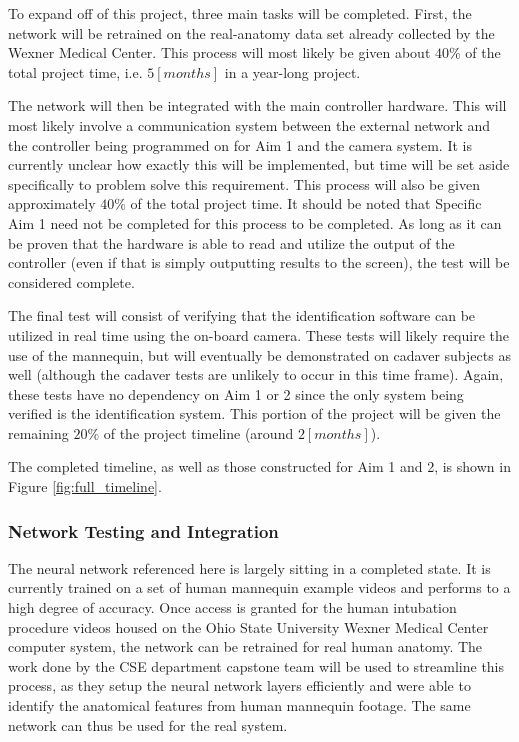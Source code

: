 		To expand off of this project, three main tasks will be completed. First, the network will be retrained on the real-anatomy data set already collected by the Wexner Medical Center. This process will most likely be given about $40\%$ of the total project time, i.e. $5[months]$ in a year-long project.
		
		The network will then be integrated with the main controller hardware. This will most likely involve a communication system between the external network and the controller being programmed on for Aim 1 and the camera system. It is currently unclear how exactly this will be implemented, but time will be set aside specifically to problem solve this requirement. This process will also be given approximately $40\%$ of the total project time. It should be noted that Specific Aim 1 need not be completed for this process to be completed. As long as it can be proven that the hardware is able to read and utilize the output of the controller (even if that is simply outputting results to the screen), the test will be considered complete.
		
		The final test will consist of verifying that the identification software can be utilized in real time using the on-board camera. These tests will likely require the use of the mannequin, but will eventually be demonstrated on cadaver subjects as well (although the cadaver tests are unlikely to occur in this time frame). Again, these tests have no dependency on Aim 1 or 2 since the only system being verified is the identification system. This portion of the project will be given the remaining $20\%$ of the project timeline (around $2[months]$).

		The completed timeline, as well as those constructed for Aim 1 and 2, is shown in Figure \ref{fig:full_timeline}.
		
	\subsubsection{Network Testing and Integration}
		The neural network referenced here is largely sitting in a completed state. It is currently trained on a set of human mannequin example videos and performs to a high degree of accuracy. Once access is granted for the human intubation procedure videos housed on the Ohio State University Wexner Medical Center computer system, the network can be retrained for real human anatomy. The work done by the CSE department capstone team will be used to streamline this process, as they setup the neural network layers efficiently and were able to identify the anatomical features from human mannequin footage. The same network can thus be used for the real system.


